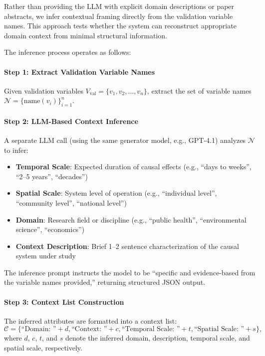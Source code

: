 Rather than providing the LLM with explicit domain descriptions or paper abstracts, we infer contextual framing directly from the validation variable names. This approach tests whether the system can reconstruct appropriate domain context from minimal structural information.

The inference process operates as follows:

\paragraph{Step 1: Extract Validation Variable Names}
Given validation variables \(V_{\text{val}} = \{v_1, v_2, \ldots, v_n\}\), extract the set of variable names \(\mathcal{N} = \{\text{name}(v_i)\}_{i=1}^n\).

\paragraph{Step 2: LLM-Based Context Inference}
A separate LLM call (using the same generator model, e.g., GPT-4.1) analyzes \(\mathcal{N}\) to infer:
\begin{itemize}
\item \textbf{Temporal Scale}: Expected duration of causal effects (e.g., ``days to weeks'', ``2--5 years'', ``decades'')
\item \textbf{Spatial Scale}: System level of operation (e.g., ``individual level'', ``community level'', ``national level'')
\item \textbf{Domain}: Research field or discipline (e.g., ``public health'', ``environmental science'', ``economics'')
\item \textbf{Context Description}: Brief 1--2 sentence characterization of the causal system under study
\end{itemize}

The inference prompt instructs the model to be ``specific and evidence-based from the variable names provided,'' returning structured JSON output.

\paragraph{Step 3: Context List Construction}
The inferred attributes are formatted into a context list:
\[
\mathcal{C} = \{\text{``Domain: ''} + d, \text{``Context: ''} + c, \text{``Temporal Scale: ''} + t, \text{``Spatial Scale: ''} + s\},
\]
where \(d\), \(c\), \(t\), and \(s\) denote the inferred domain, description, temporal scale, and spatial scale, respectively.

